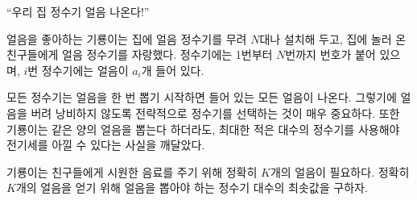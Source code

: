 ``우리 집 정수기 얼음 나온다!''

얼음을 좋아하는 기룡이는 집에 얼음 정수기를 무려 $N$대나 설치해 두고, 집에 놀러 온 친구들에게 얼음 정수기를 자랑했다.
정수기에는 1번부터 $N$번까지 번호가 붙어 있으며, $i$번 정수기에는 얼음이 $a_i$개 들어 있다. 

모든 정수기는 얼음을 한 번 뽑기 시작하면 들어 있는 모든 얼음이 나온다.
그렇기에 얼음을 버려 낭비하지 않도록 전략적으로 정수기를 선택하는 것이 매우 중요하다.
또한 기룡이는 같은 양의 얼음을 뽑는다 하더라도, 최대한 적은 대수의 정수기를 사용해야 전기세를 아낄 수 있다는 사실을 깨달았다.

기룡이는 친구들에게 시원한 음료를 주기 위해 정확히 $K$개의 얼음이 필요하다. 
정확히 $K$개의 얼음을 얻기 위해 얼음을 뽑아야 하는 정수기 대수의 최솟값을 구하자.